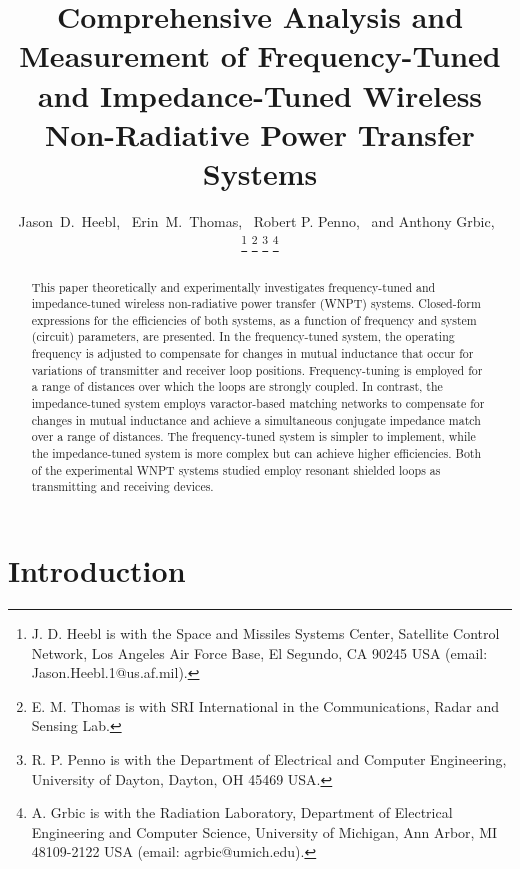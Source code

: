 \documentclass[journal]{IEEEtran}
\begin{document}
\title{Comprehensive Analysis and Measurement of Frequency-Tuned and Impedance-Tuned Wireless Non-Radiative Power Transfer Systems}

\author{Jason~D.~Heebl,~
        Erin~M.~Thomas,~
        Robert P. Penno,~
        and Anthony Grbic,~

\thanks{J. D. Heebl is with the Space and Missiles Systems Center, Satellite Control Network, Los Angeles Air Force Base, El Segundo, CA 90245 USA (email: Jason.Heebl.1@us.af.mil).}
\thanks{E. M. Thomas is with SRI International in the Communications, Radar and Sensing Lab.}
\thanks{R. P. Penno is with the Department of Electrical and Computer Engineering, University of Dayton, Dayton, OH 45469 USA.}
\thanks{A. Grbic is with the Radiation Laboratory, Department of Electrical Engineering and Computer Science, University of Michigan, Ann Arbor, MI 48109-2122 USA (email: agrbic@umich.edu).}
}

\maketitle

\begin{abstract}
This paper theoretically and experimentally investigates frequency-tuned and impedance-tuned wireless non-radiative power transfer (WNPT) systems. Closed-form expressions for the efficiencies of both systems, as a function of frequency and system (circuit) parameters, are presented. In the frequency-tuned system, the operating frequency is adjusted to compensate for changes in mutual inductance that occur for variations of transmitter and receiver loop positions.  Frequency-tuning is employed for a range of distances over which the loops are strongly coupled.  In contrast, the impedance-tuned system employs varactor-based matching networks to compensate for changes in mutual inductance and achieve a simultaneous conjugate impedance match over a range of distances. The frequency-tuned system is simpler to implement, while the impedance-tuned system is more complex but can achieve higher efficiencies.  Both of the experimental WNPT systems studied employ resonant shielded loops as transmitting and receiving devices.
\end{abstract}

\section{Introduction}
\end{document}
